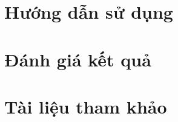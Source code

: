 \documentclass[]{article}
\begin{document}
\setlength{\parskip}{.7em}
\tableofcontents
\newpage

\setlength{\parskip}{.5em}
\newpage

\section{Hướng dẫn sử dụng}
\lipsum[1-2]

\section{Đánh giá kết quả}

\newpage

\section{Tài liệu tham khảo}
\end{document}
